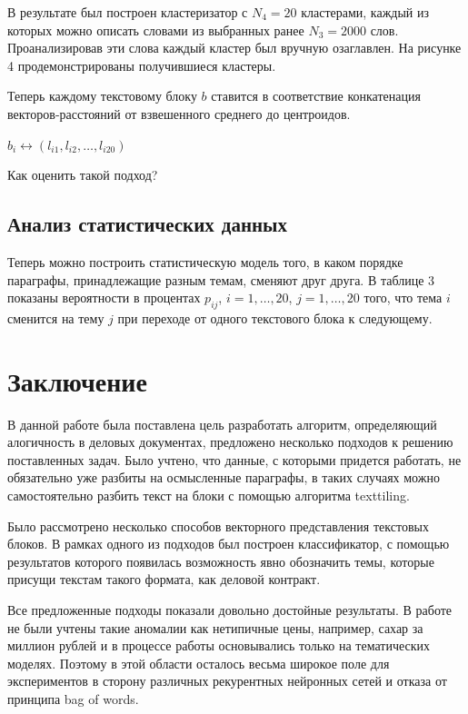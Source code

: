 \documentclass[12pt]{article}
\newcounter{c_tab}
\begin{document}
В результате был построен кластеризатор с $N_4 = 20$ кластерами, каждый из которых можно описать словами из выбранных ранее $N_3 = 2000$ слов. Проанализировав эти слова каждый кластер был вручную озаглавлен. На рисунке 4 продемонстрированы получившиеся кластеры. 

Теперь каждому текстовому блоку $b$ ставится в соответствие конкатенация векторов-расстояний от взвешенного среднего до центроидов.

\begin{center}
	$b_i \leftrightarrow (l_{i1}, l_{i2},\ldots, l_{i20})$
\end{center}

Как оценить такой подход?  

\subsection{Анализ статистических данных}
Теперь можно построить статистическую модель того, в каком порядке параграфы, принадлежащие разным темам, сменяют друг друга. В таблице 3 показаны вероятности в процентах $p_{ij}$, $i = 1,\ldots, 20$, $j = 1,\ldots, 20$ того, что тема $i$ сменится на тему $j$ при переходе от одного текстового блока к следующему.


\newpage

\section{Заключение}
В данной работе была поставлена цель разработать алгоритм, определяющий алогичность в деловых документах, предложено несколько подходов к решению поставленных задач. Было учтено, что данные, с которыми придется работать, не обязательно уже разбиты на осмысленные параграфы, в таких случаях можно самостоятельно разбить текст на блоки с помощью алгоритма texttiling. 

Было рассмотрено несколько способов векторного представления текстовых блоков. В рамках одного из подходов был построен классификатор, с помощью результатов которого появилась возможность явно обозначить темы, которые присущи текстам такого формата, как деловой контракт. 

Все предложенные подходы показали довольно достойные результаты. В работе не были учтены такие аномалии как нетипичные цены, например, сахар за миллион рублей и в процессе работы основывались только на тематических моделях. Поэтому в этой области осталось весьма широкое поле для экспериментов в сторону различных рекурентных нейронных сетей и отказа от принципа bag of words.
\end{document}
